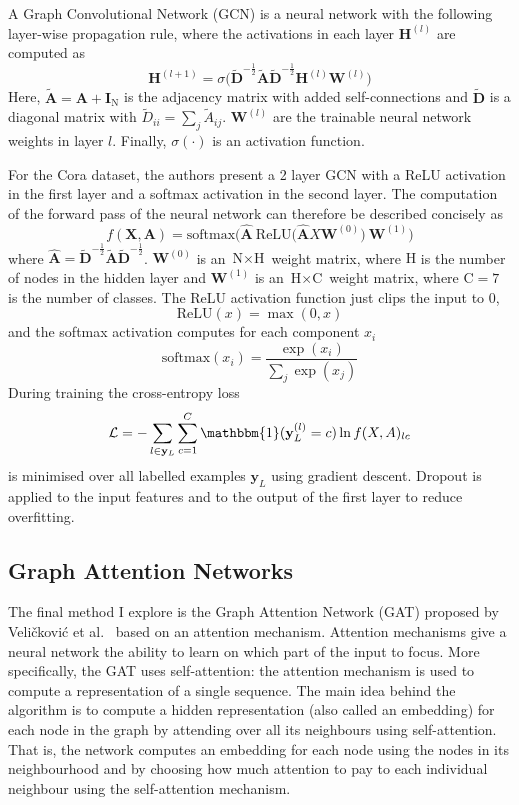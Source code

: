 \documentclass[12pt]{article}
\theoremstyle{definition}
\begin{document}
\bigskip

A Graph Convolutional Network (GCN) is a neural network with the following layer-wise propagation rule, where the activations in each layer $\mathbf{H}^{(l)}$ are computed as
\[
\mathbf{H}^{(l+1)} = \sigma \big( \tilde{\mathbf{D}}^{-\frac{1}{2}} \tilde{\mathbf{A}} \tilde{\mathbf{D}}^{-\frac{1}{2}} \mathbf{H}^{(l)} \mathbf{W}^{(l)}\big)
\]
Here, $\tilde{\mathbf{A}} = \mathbf{A} + \mathbf{I}_\textrm{N}$ is the adjacency matrix with added self-connections and $\tilde{\mathbf{D}}$ is a diagonal  matrix with $\tilde{D}_{ii} = \sum_{j} \tilde{A}_{ij}$. $\mathbf{W}^{(l)}$ are the trainable neural network weights in layer $l$. Finally, $\sigma(\cdot)$ is an activation function.

\bigskip

For the Cora dataset, the authors present a 2 layer GCN with a ReLU activation in the first layer and a softmax activation in the second layer. The computation of the forward pass of the neural network can therefore be described concisely as
\[
f(\mathbf{X},\mathbf{A}) = \textrm{softmax}\big(\hat{\mathbf{A}}\ \textrm{ReLU}\big( \hat{\mathbf{A}} X \mathbf{W}^{(0)} \big)\ \mathbf{W}^{(1)} \big)
\]
where $\hat{\mathbf{A}} = \tilde{\mathbf{D}}^{-\frac{1}{2}} \tilde{\mathbf{A}} \tilde{\mathbf{D}}^{-\frac{1}{2}}$. $\mathbf{W}^{(0)}$ is an $\textrm{N} \times \textrm{H}$ weight matrix, where $\textrm{H}$ is the number of nodes in the hidden layer and $\mathbf{W}^{(1)}$ is an $\textrm{H} \times \textrm{C}$ weight matrix, where $\textrm{C} = 7$ is the number of classes. The ReLU activation function just clips the input to 0,
\[
\textrm{ReLU}(x) = \max(0, x)
\]
and the softmax activation computes for each component $x_i$
\[
\textrm{softmax}(x_i) = \frac{\exp(x_i)}{\sum_j \exp(x_j)}
\]
During training the cross-entropy loss 
\[
\mathcal{L} = - \sum_{l \in \mathbf{y}_L} \sum_{c=1}^{C} \mathbbm{1}(
\textbf{y}_{L}^{(l)} = c) \ln f(X,A)_{lc}
\]
is minimised over all labelled examples $\textbf{y}_L$ using gradient descent. Dropout \cite{srivastava2014dropout} is applied to the input features and to the output of the first layer to reduce overfitting.

\subsection{Graph Attention Networks}
The final method I explore is the Graph Attention Network (GAT) proposed by Veli{\v{c}}kovi{\'{c}} et al.\ \cite{velickovic2018graph} based on an attention mechanism. Attention mechanisms give a neural network the ability to learn on which part of the input to focus. More specifically, the GAT uses self-attention: the attention mechanism is used to compute a representation of a single sequence. The main idea behind the algorithm is to compute a hidden representation (also called an embedding) for each node in the graph by attending over all its neighbours using self-attention. That is, the network computes an embedding for each node using the nodes in its neighbourhood and by choosing how much attention to pay to each individual neighbour using the self-attention mechanism.
\end{document}
